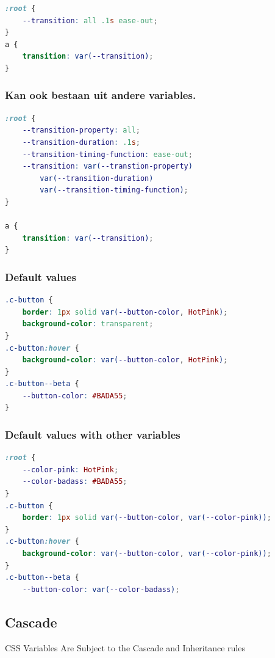 \documentclass{article}
\begin{document}
\begin{lstlisting}[language=CSS]
:root {
    --transition: all .1s ease-out;
}
a {
    transition: var(--transition);
}   
\end{lstlisting}

\subsubsection{Kan ook bestaan uit andere variables.}

\begin{lstlisting}[language=CSS]
:root {
    --transition-property: all;
    --transition-duration: .1s;
    --transition-timing-function: ease-out;
    --transition: var(--transtion-property) 
        var(--transition-duration) 
        var(--transition-timing-function);
}

a {
    transition: var(--transition);
}
\end{lstlisting}

\subsubsection{Default values}

\begin{lstlisting}[language=CSS]
.c-button {
    border: 1px solid var(--button-color, HotPink);
    background-color: transparent;
}
.c-button:hover {
    background-color: var(--button-color, HotPink);
}
.c-button--beta {
    --button-color: #BADA55;
}
\end{lstlisting}

\subsubsection{Default values with other variables}

\begin{lstlisting}[language=CSS]
:root {
    --color-pink: HotPink;
    --color-badass: #BADA55;
}
.c-button {
    border: 1px solid var(--button-color, var(--color-pink));
}
.c-button:hover {
    background-color: var(--button-color, var(--color-pink));
}
.c-button--beta {
    --button-color: var(--color-badass);
\end{lstlisting}

\subsection{Cascade}
CSS Variables Are Subject to the Cascade and Inheritance rules
\end{document}
